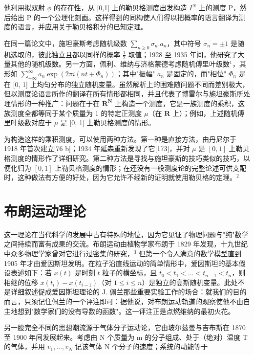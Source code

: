 他利用拟双射 \(\phi\) 的存在性，从 [0,1] 上的勒贝格测度出发构造 \(I^{N}\) 上的测度 P，然后给出 P 的一个公理化刻画。这样得到的同构使人们得以把概率的语言翻译为测度的语言，并应用关于勒贝格积分的已知定理。

在同一篇论文中，施坦豪斯考虑随机级数 \(\sum_{n\geq 0}\sigma_n.a_n\)，其中符号 \(\sigma_{n} = \pm 1\) 是随机选取的，彼此独立且都以同样的概率 \(\frac{1}{2}\) 取值；1928 至 1935 年间，他研究了大量其他的随机级数。另一方面，佩利、维纳与济格蒙德考虑随机傅里叶级数\(^{1}\)，其形如 \(\sum_{-\infty}^{\infty}a_n\exp (2\pi i(nt + \varPhi_n))\)；其中"振幅" \(a_{n}\) 是固定的，而"相位" \(\varPhi_{n}\) 是在 [0, 1] 上均匀分布的独立随机变量。虽然解析上的困难随问题不同而差别极大，但以测度论语言所作的翻译在所有情形都相同，并且代表了博雷尔与施坦豪斯所处理情形的一种推广：问题在于在 \(\mathbf{R}^{\mathbf{N}}\) 上构造一个测度，它是一族测度的乘积，这族测度全都等同于某个质量为 1 的特定正测度 \(\mu\)（在 \(\mathbf{R}\) 上）；例如，上述随机傅里叶级数对应于 \(\mu\) 是 [0, 1] 上勒贝格测度的情形。

为构造这样的乘积测度，可以使用两种方法。第一种是直接方法，由丹尼尔于 1918 年首次建立{[}76 b{]}；1934 年延森重新发现了它{[}173{]}，并对 \(\mu\) 是 \([0,1]\) 上勒贝格测度的情形作了详细研究。第二种方法是寻找与施坦豪斯的技巧类似的技巧，以便化归为 \([0,1]\) 上勒贝格测度的情形；在还没有一般测度论的完整论述可供支配时，这种做法有方便的好处，因为它允许不经新的证明就使用勒贝格的定理。\(^{2}\)

\section*{布朗运动理论}
{}

这一理论在当代科学的发展中占有特殊的地位，因为它见证了物理问题与"纯"数学之间持续而富有成果的交流。布朗运动由植物学家布朗于 1829 年发现，十九世纪中众多物理学家曾对它进行过密集的研究，\(^{3}\) 但第一个令人满意的数学模型直到 1905 年才由爱因斯坦发明。在粒子沿直线运动的简单情形中，爱因斯坦的基本假设表述如下：若 \(x(t)\) 是时刻 \(t\) 粒子的横坐标，且 \(t_0 < t_1 < \ldots < t_{n-1} < t_n\)，则相继的位移 \(x(t_i) - x(t_{i-1})\)（对 \(1 \leq i \leq n\)）是独立的高斯随机变量。此处不是详细叙述促成爱因斯坦理论的 J. 佩兰那些重要实验工作的场合：就我们的目的而言，只须记住佩兰的一个评注即可：据他说，对布朗运动轨道的观察使他不由自主地想到"数学家们的没有导数的函数"。这一评注正是点燃维纳的最初火花。

另一股完全不同的思想潮流源于气体分子运动论，它由玻尔兹曼与吉布斯在 1870 至 1900 年间发展起来。考虑由 N 个质量为 m 的分子组成、处于（绝对）温度 T 的气体，并用 \(v_{1}, \ldots, v_{N}\) 记该气体 N 个分子的速度；系统的动能等于

